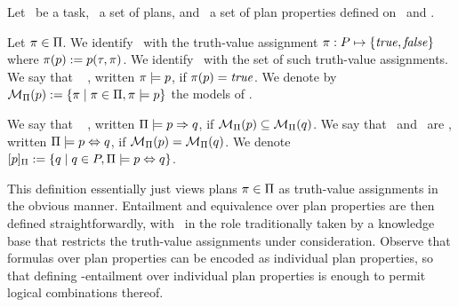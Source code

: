 
\begin{definition}
Let \task\ be a task, \plans\ a set of plans, and \props\ a set of
plan properties defined on \task\ and \plans.

Let $\pi \in \Pi$. We identify \plan\ with the truth-value
assignment $\pi : P \mapsto \{\mathit{true}, \mathit{false}\}$ where
$\pi(p) := p(\tau,\pi)$. We identify \plans\ with the set
of such truth-value assignments. We say that
\plan\  \prop, written $\pi \models p$, if
$\pi(p) = \mathit{true}$. We denote by ${\cal M}_{\Pi}(p) :=
\{\pi \mid \pi \in \Pi, \pi \models p\}$ the models of
\prop. 
%

We say that \prop\  \propq, written
$\Pi \models p \Rightarrow q$, if ${\cal M}_{\Pi}(p)
\subseteq {\cal M}_{\Pi}(q)$.
%
We say that \prop\ and \propq\ are ,
written $\Pi \models p \Leftrightarrow q$, if ${\cal M}_{\Pi}(p) =
{\cal M}_{\Pi}(q)$. We denote $[p]_{\Pi} :=
\{q \mid q \in P, \Pi \models p \Leftrightarrow q\}$.
\end{definition}

This definition essentially just views plans $\pi \in \Pi$ as
truth-value assignments in the obvious manner. Entailment and
equivalence over plan properties are then defined straightforwardly,
with \plans\ in the role traditionally taken by a knowledge base that
restricts the truth-value assignments under consideration. Observe
that formulas over plan properties can be encoded as individual plan
properties, so that defining \plans-entailment over individual plan
properties is enough to permit logical combinations thereof.

